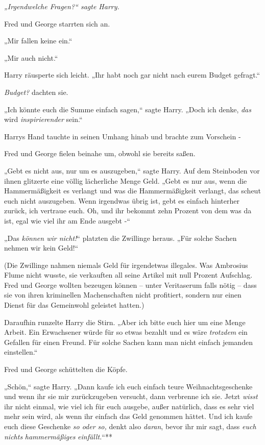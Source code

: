 {\emph{„Irgendwelche Fragen?“ sagte Harry.}

Fred und George starrten sich an.

„Mir fallen keine ein.“

„Mir auch nicht.“

Harry räusperte sich leicht. „Ihr habt noch gar nicht nach eurem Budget gefragt.“

\emph{Budget?} dachten sie.

„Ich könnte euch die Summe einfach sagen,“ sagte Harry. „Doch ich denke, \emph{das} wird \emph{inspirierender} sein.“

Harrys Hand tauchte in seinen Umhang hinab und brachte zum Vorschein -

Fred und George fielen beinahe um, obwohl sie bereits saßen.

„Gebt es nicht aus, nur um es auszugeben,“ sagte Harry. Auf dem Steinboden vor ihnen glitzerte eine völlig lächerliche Menge Geld. „Gebt es nur aus, wenn die Hammermäßigkeit es verlangt und was die Hammermäßigkeit verlangt, das scheut euch nicht auszugeben. Wenn irgendwas übrig ist, gebt es einfach hinterher zurück, ich vertraue euch. Oh, und ihr bekommt zehn Prozent von dem was da ist, egal wie viel ihr am Ende ausgebt -“

„Das \emph{können wir nicht!}“ platzten die Zwillinge heraus. „Für solche Sachen nehmen wir kein Geld!“

(Die Zwillinge nahmen niemals Geld für irgendetwas illegales. Was Ambrosius Flume nicht wusste, sie verkauften all seine Artikel mit null Prozent Aufschlag. Fred und George wollten bezeugen können -- unter Veritaserum falls nötig -- dass sie von ihren kriminellen Machenschaften nicht profitiert, sondern nur einen Dienst für das Gemeinwohl geleistet hatten.)

Daraufhin runzelte Harry die Stirn. „Aber ich bitte euch hier um eine Menge Arbeit. Ein Erwachsener würde für so etwas bezahlt und es wäre \emph{trotzdem} ein Gefallen für einen Freund. Für solche Sachen kann man nicht einfach jemanden einstellen.“

Fred und George schüttelten die Köpfe.

„Schön,“ sagte Harry. „Dann kaufe ich euch einfach teure Weihnachtsgeschenke und wenn ihr sie mir zurückzugeben versucht, dann verbrenne ich sie. Jetzt \emph{wisst} ihr nicht einmal, wie viel ich für euch ausgebe, außer natürlich, dass es sehr viel mehr sein wird, als wenn ihr einfach das Geld genommen hättet. Und ich kaufe euch diese Geschenke \emph{so oder so,} denkt also \emph{daran}, bevor ihr mir sagt, dass \emph{euch nichts} \emph{hammermäßiges} \emph{einfällt.}“**

}
